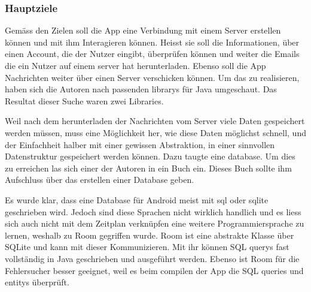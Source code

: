 \documentclass[a4paper,11pt]{article}
\begin{document}

\subsubsection{Hauptziele}
Gemäss den Zielen soll die App eine Verbindung mit einem Server erstellen können und mit ihm Interagieren können. Heisst sie soll die Informationen, über einen Account, die der 
Nutzer eingibt, überprüfen können und weiter die Emails die ein Nutzer auf einem \gls{server} hat herunterladen. Ebenso soll die App Nachrichten weiter über einen Server verschicken können. 
Um das zu realisieren, haben sich die Autoren nach passenden \glspl{library} für Java umgeschaut. Das Resultat dieser Suche waren zwei Libraries. 



Weil nach dem herunterladen der Nachrichten vom Server viele Daten gespeichert werden müssen, muss eine Möglichkeit her, wie diese Daten möglichst schnell, 
und der Einfachheit halber mit einer gewissen Abstraktion, in einer sinnvollen Datenstruktur gespeichert werden können. Dazu taugte eine \gls{database}. Um dies zu erreichen 
las sich einer der Autoren in ein Buch ein. Dieses Buch sollte ihm Aufschluss über das erstellen einer Database geben. 

Es wurde klar, dass eine Database für Android meist mit \gls{sql} oder \gls{sqlite} geschrieben wird. Jedoch sind diese Sprachen nicht wirklich handlich und es
liess sich auch nicht mit dem Zeitplan verknüpfen eine weitere Programmiersprache zu lernen, weshalb zu Room gegriffen wurde. Room ist eine abstrakte Klasse über SQLite 
und kann mit dieser Kommunizieren. Mit ihr können SQL \glspl{query} fast vollständig in Java geschrieben und ausgeführt werden. Ebenso ist Room für die Fehlersucher besser geeignet, 
weil es beim compilen der App die SQL queries und \glspl{entity} überprüft. \cite{roomInfo} \\

\begingroup
\setlength{\intextsep}{7pt}
\setlength{\columnsep}{15pt}
\end{document}
